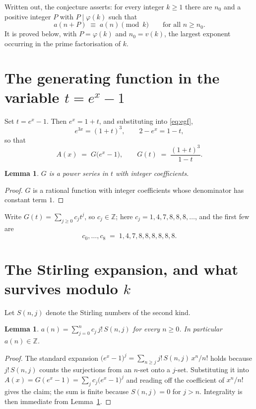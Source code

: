 \documentclass[11pt,a4paper]{article}
\theoremstyle{plain}
\newtheorem{lemma}[theorem]{Lemma}
\theoremstyle{definition}
\begin{document}
Written out, the conjecture asserts: for every integer $k\ge 1$ there are $n_0$ and a
positive integer $P$ with $P\mid\varphi(k)$ such that
\begin{equation}\label{eq:conj}
a(n+P)\;\equiv\;a(n)\pmod{k}\qquad\text{for all } n\ge n_0 .
\end{equation}
It is proved below, with $P=\varphi(k)$ and $n_0=v(k)$, the largest exponent occurring in
the prime factorisation of $k$.

\section{The generating function in the variable $t=e^{x}-1$}

Set $t=e^{x}-1$. Then $e^{x}=1+t$, and substituting into \eqref{eq:egf},
\[
e^{3x}=(1+t)^{3},\qquad 2-e^{x}=1-t,
\]
so that
\begin{equation}\label{eq:G}
A(x)\;=\;G\bigl(e^{x}-1\bigr),\qquad
G(t)\;=\;\frac{(1+t)^{3}}{1-t}.
\end{equation}

\begin{lemma}\label{lem:int}
$G$ is a power series in $t$ with integer coefficients.
\end{lemma}

\begin{proof}
$G$ is a rational function with integer coefficients whose denominator has constant term $1$.
\end{proof}

Write $G(t)=\sum_{j\ge0}c_j t^{j}$, so $c_j\in\mathbb{Z}$; here $c_j = 1, 4, 7, 8, 8, 8, \dots$, and the
first few are
\[
c_0,\dots,c_8 \;=\; 1, 4, 7, 8, 8, 8, 8, 8, 8.
\]

\section{The Stirling expansion, and what survives modulo $k$}

Let $S(n,j)$ denote the Stirling numbers of the second kind.

\begin{lemma}\label{lem:stir}
$a(n)=\sum_{j=0}^{n} c_j\, j!\, S(n,j)$ for every $n\ge 0$. In particular $a(n)\in\mathbb{Z}$.
\end{lemma}

\begin{proof}
The standard expansion $\bigl(e^{x}-1\bigr)^{j}
=\sum_{n\ge j} j!\,S(n,j)\,x^{n}/n!$ holds because $j!\,S(n,j)$ counts the surjections
from an $n$-set onto a $j$-set. Substituting it into
$A(x)=G(e^{x}-1)=\sum_j c_j\bigl(e^{x}-1\bigr)^{j}$ and reading off the coefficient of
$x^{n}/n!$ gives the claim; the sum is finite because $S(n,j)=0$ for $j>n$. Integrality is
then immediate from Lemma~\ref{lem:int}.
\end{proof}
\end{document}

